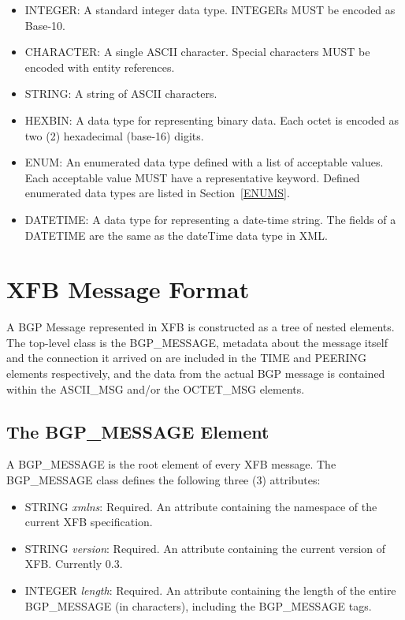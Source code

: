 \documentclass{article}
\begin{document}
\begin{itemize}
\item{INTEGER: A standard integer data type.  INTEGERs MUST be encoded as Base-10.}
\item{CHARACTER: A single ASCII character.  Special characters MUST be encoded with entity references.}
\item{STRING: A string of ASCII characters.}
\item{HEXBIN: A data type for representing binary data.  Each octet is encoded as two (2) hexadecimal (base-16) digits.}
\item{ENUM: An enumerated data type defined with a list of acceptable values.  Each acceptable value MUST have a representative keyword.  Defined enumerated data types are listed in Section~\ref{ENUMS}.}
\item{DATETIME: A data type for representing a date-time string.  The fields of a DATETIME are the same as the dateTime data type in XML.}
\end{itemize}

\section{XFB Message Format}
\label{XFB}

A BGP Message represented in XFB is constructed as a tree of nested elements.  The top-level class is the BGP_MESSAGE, metadata about the message itself and the connection it arrived on are included in the TIME and PEERING elements respectively, and the data from the actual BGP message is contained within the ASCII_MSG and/or
the OCTET_MSG elements.

\subsection{The BGP_MESSAGE Element}
\label{BGPMESSAGE}

A BGP_MESSAGE is the root element of every XFB message.  The BGP_MESSAGE class defines the following three (3) attributes:

\begin{itemize}
\item{STRING \emph{xmlns}: Required. An attribute containing the namespace of the current XFB specification.}
\item{STRING \emph{version}: Required. An attribute containing the current version of XFB.  Currently 0.3.}
\item{INTEGER \emph{length}: Required. An attribute containing the length of the entire BGP_MESSAGE (in characters), including the BGP_MESSAGE tags.}
\end{itemize}
\end{document}

